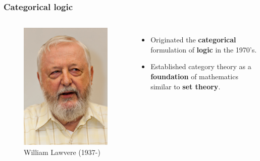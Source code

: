 \documentclass{beamer}
\begin{document}
\begin{frame}
\frametitle{Categorical logic}
\begin{columns}
		\begin{figure}
		\includegraphics[scale=1.0]{William-Lawvere.jpg}
		\caption{William Lawvere (1937-)}
		\end{figure}
		\begin{itemize}
			\item Originated the \textbf{categorical} formulation of \textbf{logic} in the 1970's.
			
			\item Established category theory as a \textbf{foundation} of mathematics similar to \textbf{set theory}.
		\end{itemize}
\end{columns}
\end{frame}
\end{document}
